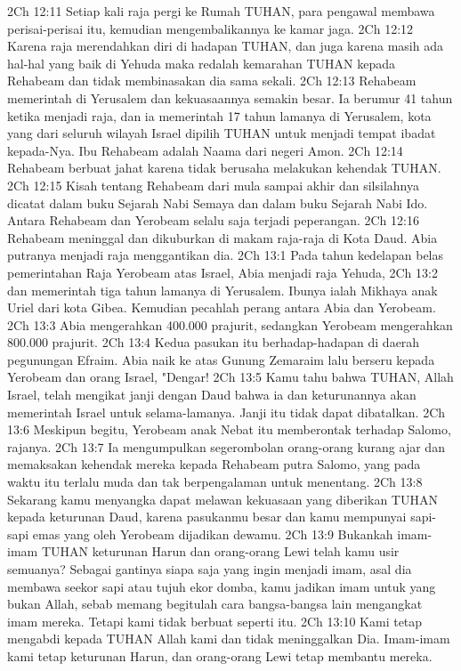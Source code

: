 2Ch 12:11  Setiap kali raja pergi ke Rumah TUHAN, para pengawal membawa perisai-perisai itu, kemudian mengembalikannya ke kamar jaga.
2Ch 12:12  Karena raja merendahkan diri di hadapan TUHAN, dan juga karena masih ada hal-hal yang baik di Yehuda maka redalah kemarahan TUHAN kepada Rehabeam dan tidak membinasakan dia sama sekali.
2Ch 12:13  Rehabeam memerintah di Yerusalem dan kekuasaannya semakin besar. Ia berumur 41 tahun ketika menjadi raja, dan ia memerintah 17 tahun lamanya di Yerusalem, kota yang dari seluruh wilayah Israel dipilih TUHAN untuk menjadi tempat ibadat kepada-Nya. Ibu Rehabeam adalah Naama dari negeri Amon.
2Ch 12:14  Rehabeam berbuat jahat karena tidak berusaha melakukan kehendak TUHAN.
2Ch 12:15  Kisah tentang Rehabeam dari mula sampai akhir dan silsilahnya dicatat dalam buku Sejarah Nabi Semaya dan dalam buku Sejarah Nabi Ido. Antara Rehabeam dan Yerobeam selalu saja terjadi peperangan.
2Ch 12:16  Rehabeam meninggal dan dikuburkan di makam raja-raja di Kota Daud. Abia putranya menjadi raja menggantikan dia.
2Ch 13:1  Pada tahun kedelapan belas pemerintahan Raja Yerobeam atas Israel, Abia menjadi raja Yehuda,
2Ch 13:2  dan memerintah tiga tahun lamanya di Yerusalem. Ibunya ialah Mikhaya anak Uriel dari kota Gibea. Kemudian pecahlah perang antara Abia dan Yerobeam.
2Ch 13:3  Abia mengerahkan 400.000 prajurit, sedangkan Yerobeam mengerahkan 800.000 prajurit.
2Ch 13:4  Kedua pasukan itu berhadap-hadapan di daerah pegunungan Efraim. Abia naik ke atas Gunung Zemaraim lalu berseru kepada Yerobeam dan orang Israel, "Dengar!
2Ch 13:5  Kamu tahu bahwa TUHAN, Allah Israel, telah mengikat janji dengan Daud bahwa ia dan keturunannya akan memerintah Israel untuk selama-lamanya. Janji itu tidak dapat dibatalkan.
2Ch 13:6  Meskipun begitu, Yerobeam anak Nebat itu memberontak terhadap Salomo, rajanya.
2Ch 13:7  Ia mengumpulkan segerombolan orang-orang kurang ajar dan memaksakan kehendak mereka kepada Rehabeam putra Salomo, yang pada waktu itu terlalu muda dan tak berpengalaman untuk menentang.
2Ch 13:8  Sekarang kamu menyangka dapat melawan kekuasaan yang diberikan TUHAN kepada keturunan Daud, karena pasukanmu besar dan kamu mempunyai sapi-sapi emas yang oleh Yerobeam dijadikan dewamu.
2Ch 13:9  Bukankah imam-imam TUHAN keturunan Harun dan orang-orang Lewi telah kamu usir semuanya? Sebagai gantinya siapa saja yang ingin menjadi imam, asal dia membawa seekor sapi atau tujuh ekor domba, kamu jadikan imam untuk yang bukan Allah, sebab memang begitulah cara bangsa-bangsa lain mengangkat imam mereka. Tetapi kami tidak berbuat seperti itu.
2Ch 13:10  Kami tetap mengabdi kepada TUHAN Allah kami dan tidak meninggalkan Dia. Imam-imam kami tetap keturunan Harun, dan orang-orang Lewi tetap membantu mereka.
